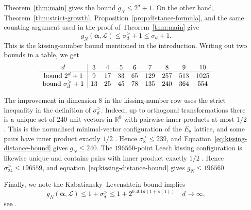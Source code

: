 \documentclass[11pt,reqno]{amsart}
\theoremstyle{definition}
\newcommand{\R}{\mathbb R}
\newcommand{\0}{\mbf 0}%
\renewcommand{\text}{\textup}
\def\R{\mathbb R}
\newcommand{\cL}{\mathcal L}
\newcommand{\balpha}{\boldsymbol{\alpha}}
\begin{document}
Theorem~\ref{thm:main} gives the bound $g_N\le 2^d+1$. On the other hand,
Theorem~\ref{thm:strict-growth}, Proposition~\ref{prop:distance-formula}, and
the same counting argument used in the proof of Theorem~\ref{thm:main} give
\begin{equation}\label{eq:kissing-distance-bound}
 g_N(\balpha,\cL)\le \sigma_d^{>}+1\le\sigma_d+1.
\end{equation}
This is the kissing-number bound mentioned in the introduction. Writing out two bounds in a table, we get
$$
\begin{array}{c|cccccccc}
d & 3 & 4 & 5 & 6 & 7 & 8 & 9 & 10 \\ \hline
\text{bound }2^d+1
  & 9 & 17 & 33 & 65 & 129 & 257 & 513 & 1025 \\
\text{bound }\sigma_d^{>}+1
  & 13 & 25 & 45 & 78 & 135 & 240 & 364 & 554
\end{array}
$$

The improvement in dimension $8$ in the kissing-number row uses the strict inequality in the definition of $\sigma_d^{>}$. Indeed, up to orthogonal transformations there is a unique set of $240$ unit
vectors in $\R^8$ with pairwise inner products at most $1/2$
\cite{BannaiSloane1981}. This is the normalised minimal-vector configuration
of the $E_8$ lattice, and some pairs have inner product exactly $1/2$
\cite{ConwaySloane1999}. Hence $\sigma_8^{>}\le239$, and
Equation~\eqref{eq:kissing-distance-bound} gives $g_N\le240$. The $196560$-point Leech kissing
configuration is likewise unique and
contains pairs with inner product exactly $1/2$
\cite{BannaiSloane1981,ConwaySloane1999}. Hence
$\sigma_{24}^{>}\le196559$, and equation~\eqref{eq:kissing-distance-bound} gives
$g_N\le196560$.

Finally, we note the Kabatiansky--Levenshtein bound implies
$$
 g_N(\balpha,\cL)
 \le 1+\sigma_d^{>}
 \le 1+2^{0.401d(1+o(1))}
 \quad d\to\infty,
$$
see \cite{KabatianskyLevenshtein1978,ConwaySloane1999}.



\end{document}
